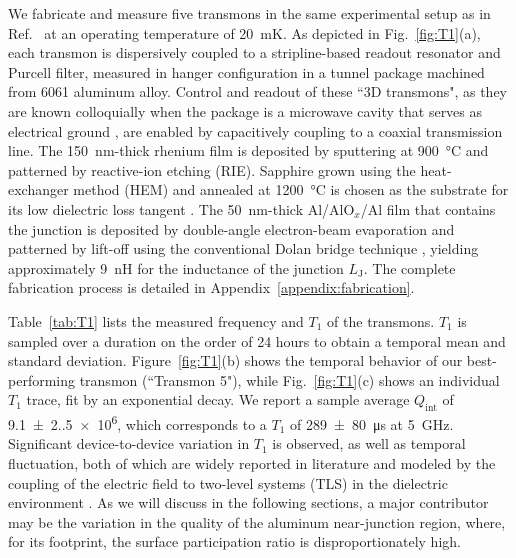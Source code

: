 \documentclass[
    reprint,
    superscriptaddress,
    amsmath,amssymb,
    aps,
    prb,
    floatfix,
]{revtex4-2}
\begin{document}
We fabricate and measure five transmons in the same experimental setup as in Ref.~\cite{ganjam2024} at an operating temperature of \SI{20}{\milli\kelvin}. As depicted in Fig.~\ref{fig:T1}(a), each transmon is dispersively coupled to a stripline-based readout resonator and Purcell filter, measured in hanger configuration in a tunnel package machined from 6061 aluminum alloy. Control and readout of these ``3D transmons", as they are known colloquially when the package is a microwave cavity that serves as electrical ground \cite{paik2011}, are enabled by capacitively coupling to a coaxial transmission line. The \SI{150}{\nano\meter}-thick rhenium film is deposited by sputtering at \SI{900}{\celsius} and patterned by reactive-ion etching (RIE). Sapphire grown using the heat-exchanger method (HEM) and annealed at \SI{1200}{\celsius} is chosen as the substrate for its low dielectric loss tangent \cite{read2023,ganjam2024}. The \SI{50}{\nano\meter}-thick Al/AlO$_x$/Al film that contains the junction is deposited by double-angle electron-beam evaporation and patterned by lift-off using the conventional Dolan bridge technique \cite{dolan1977}, yielding approximately \SI{9}{\nano\henry} for the inductance of the junction $L_\mathrm{J}$. The complete fabrication process is detailed in Appendix~\ref{appendix:fabrication}.

Table~\ref{tab:T1} lists the measured frequency and $T_1$ of the transmons. $T_1$ is sampled over a duration on the order of 24 hours to obtain a temporal mean and standard deviation. Figure~\ref{fig:T1}(b) shows the temporal behavior of our best-performing transmon (``Transmon 5"), while Fig.~\ref{fig:T1}(c) shows an individual $T_1$ trace, fit by an exponential decay. We report a sample average $Q_\mathrm{int}$ of \num{9.1(2.5)e6}, which corresponds to a $T_1$ of \SI{289(80)}{\micro\second} at \SI{5}{\giga\hertz}. Significant device-to-device variation in $T_1$ is observed, as well as temporal fluctuation, both of which are widely reported in literature and modeled by the coupling of the electric field to two-level systems (TLS) in the dielectric environment \cite{muller2015,klimov2018,burnett2019,schlor2019,bejanin2021,carroll2022}. As we will discuss in the following sections, a major contributor may be the variation in the quality of the aluminum near-junction region, where, for its footprint, the surface participation ratio is disproportionately high.
\end{document}
